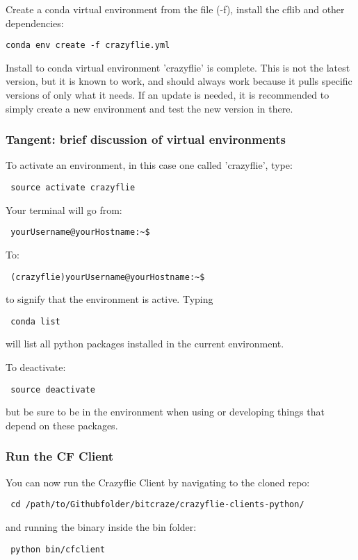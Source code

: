 \documentclass[12pt]{article}
\begin{document}
Create a conda virtual environment from the file (-f), install the cflib and other dependencies:
\begin{verbatim}
conda env create -f crazyflie.yml
\end{verbatim}

Install to conda virtual environment 'crazyflie' is complete. This is not the latest version, but it is known to work, and should always work because it pulls specific versions of only what it needs. If an update is needed, it is recommended to simply create a new environment and test the new version in there.

\subsubsection{Tangent: brief discussion of virtual environments}
To activate an environment, in this case one called 'crazyflie', type:
\begin{verbatim} source activate crazyflie \end{verbatim}
Your terminal will go from:
\begin{verbatim} yourUsername@yourHostname:~$ \end{verbatim}
To:
\begin{verbatim} (crazyflie)yourUsername@yourHostname:~$ \end{verbatim}
to signify that the environment is active. Typing \begin{verbatim} conda list \end{verbatim} will list all python packages installed in the current environment.

To deactivate:
\begin{verbatim} source deactivate \end{verbatim}

but be sure to be in the environment when using or developing things that depend on these packages.

\subsubsection{Run the CF Client}
You can now run the Crazyflie Client by navigating to the cloned repo:
\begin{verbatim} cd /path/to/Githubfolder/bitcraze/crazyflie-clients-python/ \end{verbatim}
and running the binary inside the bin folder:
\begin{verbatim} python bin/cfclient \end{verbatim}
\end{document}
